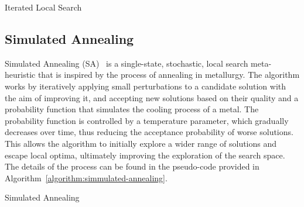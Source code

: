 \begin{algorithm}[htb!]
    \DontPrintSemicolon
    \caption{Iterated Local Search}
    \label{algorithm:iterated-local-search}
\end{algorithm}

\subsection{Simulated Annealing}

Simulated Annealing
(SA)~\cite{kirkpatrick1983optimization,nikolaev2010simulateda,
    luke2013essentialsa,blummetaheuristics} is a single-state, stochastic, local
search meta-heuristic that is inspired by the process of annealing in
metallurgy.  The algorithm works by iteratively applying small perturbations to
a candidate solution with the aim of improving it, and accepting new solutions
based on their quality and a probability function that simulates the cooling
process of a metal. The probability function is controlled by a temperature
parameter, which gradually decreases over time, thus reducing the acceptance
probability of worse solutions. This allows the algorithm to initially explore a
wider range of solutions and escape local optima, ultimately improving the
exploration of the search space. The details of the process can be found in the
pseudo-code provided in Algorithm~\ref{algorithm:simmulated-annealing}.

\begin{algorithm}[htb!]
    \DontPrintSemicolon
    \caption{Simulated Annealing}
    \label{algorithm:simmulated-annealing}
\end{algorithm}

